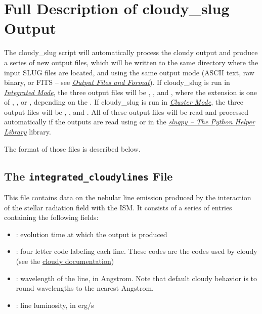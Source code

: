 \documentclass[letterpaper,10pt,english]{sphinxmanual}
\begin{document}
\section{Full Description of cloudy\_slug Output}
\label{cloudy:ssec-cloudy-output}\label{cloudy:full-description-of-cloudy-slug-output}
The cloudy\_slug script will automatically process the cloudy output
and produce a series of new output files, which will be written to the
same directory where the input SLUG files are located, and using the
same output mode (ASCII text, raw binary, or FITS -- see
{\hyperref[output:sec\string-output]{\emph{Output Files and Format}}}). If cloudy\_slug is run in
{\hyperref[cloudy:sssec\string-cloudy\string-integrated\string-mode]{\emph{Integrated Mode}}}, the three output files will be
,
, and
, where the extension 
is one of , , or , depending on the
. If cloudy\_slug is run in
{\hyperref[cloudy:sssec\string-cloudy\string-cluster\string-mode]{\emph{Cluster Mode}}}, the three output files will be
,
, and
. All of these output files will
be read and processed automatically if the outputs are read using
 or  in the {\hyperref[slugpy:sec\string-slugpy]{\emph{slugpy -- The Python Helper Library}}}
library.

The format of those files is described below.


\subsection{The \texttt{integrated\_cloudylines} File}
\label{cloudy:the-integrated-cloudylines-file}
This file contains data on the nebular line emission produced by the
interaction of the stellar radiation field with the ISM. It consists
of a series of entries containing the following fields:
\begin{itemize}
\item {} 
: evolution time at which the output is produced

\item {} 
: four letter code labeling each line. These codes
are the codes used by cloudy (see the \href{http://nublado.org}{cloudy documentation})

\item {} 
: wavelength of the line, in Angstrom. Note that
default cloudy behavior is to round wavelengths to the nearest
Angstrom.

\item {} 
: line luminosity, in erg/s

\end{itemize}
\end{document}
